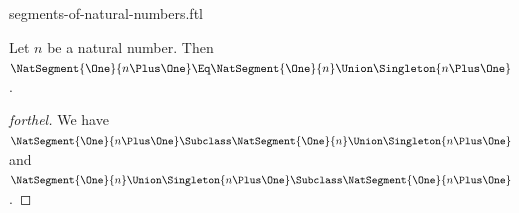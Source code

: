 \documentclass{stex}
\begin{document}
\begin{smodule}{segments-of-natural-numbers.ftl}
\begin{proposition*}[forthel]
  Let $n$ be a natural number.
  Then $\NatSegment{\One}{n \Plus \One} \Eq \NatSegment{\One}{n} \Union \Singleton{n \Plus \One}$.
\end{proposition*}
\begin{proof}[forthel]
  We have
  $\NatSegment{\One}{n \Plus \One} \Subclass \NatSegment{\One}{n} \Union \Singleton{n \Plus \One}$ and $\NatSegment{\One}{n} \Union \Singleton{n \Plus \One} \Subclass \NatSegment{\One}{n \Plus \One}$.
\end{proof}

\end{smodule}
\end{document}
